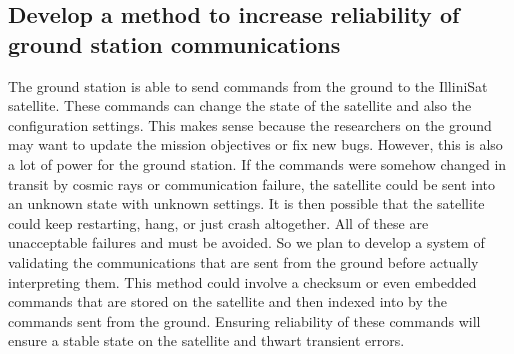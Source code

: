 \subsection{Develop a method to increase reliability of ground station
communications}
The ground station is able to send commands from the ground to the IlliniSat satellite. These commands
can change the state of the satellite and also the configuration settings. This makes sense because the
researchers on the ground may want to update the mission objectives or fix new bugs. However, this is
also a lot of power for the ground station. If the commands were somehow changed in transit by cosmic 
rays or communication failure, the satellite could be sent into an unknown state with unknown settings. 
It is then possible that the satellite could keep restarting, hang, or just crash altogether. All of these are
unacceptable failures and must be avoided. So we plan to develop a system of validating the 
communications that are sent from the ground before actually interpreting them. This method could 
involve a checksum or even embedded commands that are stored on the satellite and then indexed into
by the commands sent from the ground. Ensuring reliability of these commands will ensure a stable state
on the satellite and thwart transient errors.

